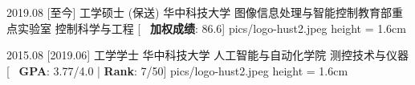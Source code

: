 \begin{educations}
    \education
    {2019.08}
    [至今]
    {工学硕士 (保送)}
    {华中科技大学}
    {图像信息处理与智能控制教育部重点实验室}
    {控制科学与工程}
    [\textbullet ~ \textbf{加权成绩}: 86.6]
    {pics/logo-hust2.jpeg} {height = 1.6cm}

    \separator{0.5ex}
    \education
    {2015.08}
    [2019.06]
    {工学学士}
    {华中科技大学}
    {人工智能与自动化学院}
    {测控技术与仪器}
    [\textbullet ~ \textbf{GPA}: 3.77/4.0 | \textbf{Rank}: 7/50]
    {pics/logo-hust2.jpeg} {height = 1.6cm}

\end{educations}